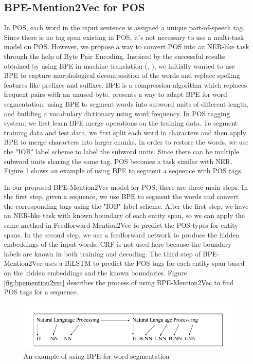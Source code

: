 \subsection{BPE-Mention2Vec for POS}
In POS, each word in the input sentence is assigned a unique part-of-speech tag. Since there is no tag span existing in POS, it's not necessary to use a multi-task model on POS. However, we propose a way to convert POS into an NER-like task through the help of Byte Pair Encoding. Inspired by the successful results obtained by using BPE in machine translation (\citeauthor{sennrich2015neural}, \citeyear{sennrich2015neural}), we initially wanted to use BPE to capture morphological decomposition of the words and replace spelling features like prefixes and suffixes. BPE is a compression algorithm which replaces frequent pairs with an unused byte. \cite{sennrich2015neural} presents a way to adapt BPE for word segmentation: using BPE to segment words into subword units of different length, and building a vocabulary dictionary using word frequency. In POS tagging system, we first learn BPE merge operations on the training data. To segment training data and test data, we first split each word in characters and then apply BPE to merge characters into larger chunks. In order to restore the words, we use the "IOB" label scheme to label the subword units. Since there can be multiple subword units sharing the same tag, POS becomes a task similar with NER. Figure \ref{fig:bpe} shows an example of using BPE to segment a sequence with POS tags. 

In our proposed BPE-Mention2Vec model for POS, there are three main steps. In the first step, given a sequence, we use BPE to segment the words and convert the corresponding tags using the "IOB" label scheme. After the first step, we have an NER-like task with known boundary of each entity span, so we can apply the same method in Feedforward-Mention2Vec to predict the POS types for entity spans. In the second step, we use a feedforward network to produce the hidden embeddings of the input words. CRF is not used here because the boundary labels are known in both training and decoding. The third step of BPE-Mention2Vec uses a BiLSTM to predict the POS tags for each entity span based on the hidden embeddings and the known boundaries. Figure \ref{fig:bpemention2vec} describes the process of using BPE-Mention2Vec to find POS tags for a sequence. 


\begin{figure}
  \centering
  \includegraphics[scale=0.5]{bpe.png}
 \caption{An example of using BPE for word segmentation}
  \label{fig:bpe}
\end{figure}

